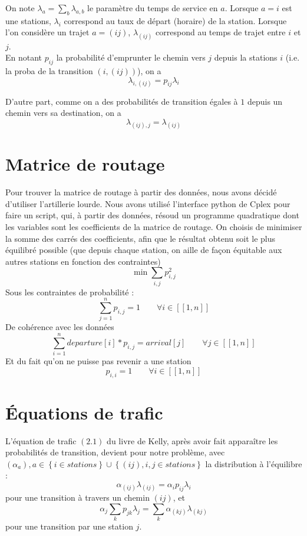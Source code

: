 \documentclass[12pt,a4paper]{article}
\begin{document}
On note $\lambda_a = \sum_b \lambda_{a,b}$ le paramètre du temps de service en $a$.
Lorsque $a = i$ est une stations, $\lambda_i$ correspond au taux de départ (horaire) de la station. Lorsque l'on considère un trajet $a = (ij)$, $\lambda_{(ij)}$ correspond au temps de trajet entre $i$ et $j$.\\


En notant $p_{ij}$ la probabilité d'emprunter le chemin vers $j$ depuis la stations $i$ (i.e. la proba de la transition $\left(i,(ij) \right)$), on a
\begin{equation}
\lambda_{i,(ij)} = p_{ij} \lambda_i
\end{equation}

D'autre part, comme on a des probabilités de transition égales à $1$ depuis un chemin vers sa destination, on a
\begin{equation}
\lambda_{(ij),j} = \lambda_{(ij)}
\end{equation}


\section{Matrice de routage}

Pour trouver la matrice de routage à partir des données, nous avons décidé d'utiliser l'artillerie lourde. Nous avons utilisé l'interface python de Cplex pour faire un script, qui, à partir des données, résoud un programme quadratique dont les variables sont les coefficients de la matrice de routage.
On choisis de minimiser la somme des carrés des coefficients, afin que le résultat obtenu soit le plus équilibré possible (que depuis chaque station, on aille de façon équitable aux autres stations en fonction des contraintes)
\[ 
	\min \sum_{i,j} p_{i,j}^2
\]
Sous les contraintes de probabilité :
\[
	\sum_{j=1}^n p_{i,j} = 1 \qquad \forall i \in [\![1,n]\!]
\]
De cohérence avec les données
\[
	\sum_{i=1}^n departure[i]*p_{i,j} = arrival[j] \qquad \forall j \in [\![1,n]\!]
\]
Et du fait qu'on ne puisse pas revenir a une station
\[
	p_{i,i} = 1 \qquad \forall i \in [\![1,n]\!]
\]


\section{\'Equations de trafic}

L'équation de trafic $(2.1)$ du livre de Kelly, après avoir fait apparaître les probabilités de transition, devient pour notre problème, avec $(\alpha_a), a \in \left\{ i \in stations \right\} \cup \left\{ (ij), i,j \in stations \right\}$  la distribution à l'équilibre :
\begin{equation}
\alpha_{(ij)} \lambda_{(ij)} = \alpha_i p_{ij} \lambda_i
\label{eq:trafic_1}
\end{equation}
pour une transition à travers un chemin $(ij)$, et
\begin{equation}
\alpha_j \sum_k p_{jk} \lambda_j = \sum_k \alpha_{(kj)} \lambda_{(kj)}
\label{eq:trafic_2}
\end{equation}
pour une transition par une station $j$.
\end{document}
